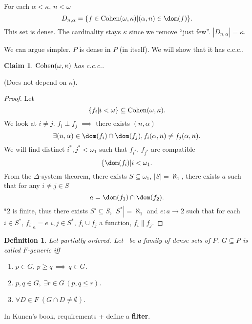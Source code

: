 \documentclass[11pt,pdftex,twoside,a4paper]{article}
\newcommand{\B}[1]{\textbf{#1}}
\newcommand{\Cohen}{\mathop{\rm Cohen}\nolimits}
\newcommand{\ccc}{c.c.c.}
\newtheorem{ldef}[thm]{Definition}
\newtheorem{claim}[thm]{Claim}
\begin{document}
For each \(\alpha < \kappa\), \(n < \omega\)
\begin{equation*}
D_{n,\alpha} = \{f\in \Cohen(\omega,\kappa)| (\alpha,n)\in\dom(f)\}.
\end{equation*}
This set is dense. The cardinality stays \(\kappa\)
since we remove ``just few''.
\(|D_{n,\alpha}|=\kappa\).

We can argue simpler. $P$ is dense in $P$ (in itself).
We will show that it has \ccc.

\begin{claim}
\(\Cohen(\omega,\kappa)\) has \ccc.
\end{claim}
(Does not depend on \(\kappa\)).
\begin{proof}
Let
\begin{equation*}
\{f_i| i < \omega\} \subseteq \Cohen(\omega,\kappa).
\end{equation*}
We look at \(i\neq j\).
\(f_i \perp f_j\)  \(\implies\) there exists \((n,\alpha)\)
\begin{equation*}
\exists(n,\alpha) \in \dom(f_i)\cap\dom(f_j), f_i(\alpha,n) \neq f_j(\alpha,n).
\end{equation*}
We will find distinct \(i^*,j^* < \omega_1\) such that
\(f_{i^*}\), \(f_{j^*}\) are compatible
\begin{equation*}
\{\dom(f_i) | i < \omega_1.
\end{equation*}
From the \(\Delta\)-system theorem, there exists \(S\subseteq \omega_1\),
\(|S|=\aleph_1\), there exists $a$ such that for any \(i\neq j\in S\)
\begin{equation*}
a = \dom(f_1) \cap \dom(f_2).
\end{equation*}
\({}^a 2\) is finite, thus there exists \(S'\subseteq S\), \(|S^*| = \aleph_1\)
and \(e: a\to 2\) such that for each \(i\in S^*\), \(f_i|_a = e\)
\(i,j\in S^*\), \(f_i \cup f_j\) a function, \(f_i\| f_j\).
\end{proof}

\begin{ldef}
Let  partially ordered.
Let \scrF\ be a family of dense sets of $P$. \(G\subseteq P\)
is called $F$-generic iff
\begin{enumerate}
\item \(p\in G,\,p \geq q\,\implies\, q\in G\).
\item \(p,q\in G,\; \exists r\in G\, (p,q \leq r)\).
\item \(\forall D\in F\; (G\cap D\neq \emptyset)\).
\end{enumerate}
\end{ldef}
In Kunen's book, requirements + define a \B{filter}.
\end{document}
